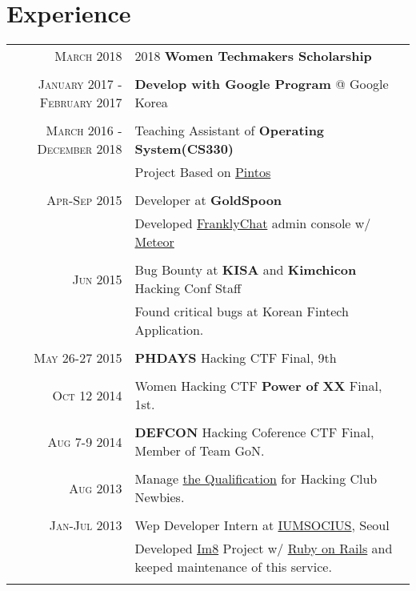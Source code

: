 \documentclass[a4paper,10pt]{article}
\begin{document}
\section{Experience}
\begin{tabular}{r|p{11cm}}
  \textsc{March 2018} & 2018 \textbf{Women Techmakers Scholarship}\\\multicolumn{2}{c}{} \\
    \textsc{January 2017 - February 2017} & \textbf{Develop with Google Program} @ Google Korea\\\multicolumn{2}{c}{} \\
    \textsc{March 2016 - December 2018} & Teaching Assistant of \textbf{Operating System(CS330)}  \\ & \footnotesize{Project Based on \href{https://web.stanford.edu/class/cs140/projects/pintos/pintos.html}{Pintos}}\\\multicolumn{2}{c}{} \\
    \textsc{Apr-Sep 2015} & Developer at \textbf{GoldSpoon}  \\ & \footnotesize{Developed \href{http://www.franklychat.com/}{FranklyChat} admin console w/ \href{https://www.meteor.com/}{Meteor}}\\\multicolumn{2}{c}{} \\
    \textsc{Jun 2015} & Bug Bounty at \textbf{KISA} and \textbf{Kimchicon} Hacking Conf Staff \\&\footnotesize{Found critical bugs at Korean Fintech Application.}\\\multicolumn{2}{c}{} \\
    \textsc{May 26-27 2015} & \textbf{PHDAYS} Hacking CTF Final, 9th \\\multicolumn{2}{c}{} \\
    \textsc{Oct 12 2014} & Women Hacking CTF \textbf{Power of XX} Final, 1st.\\\multicolumn{2}{c}{} \\
    \textsc{Aug 7-9 2014} & \textbf{DEFCON} Hacking Coference CTF Final, Member of Team GoN.\\\multicolumn{2}{c}{} \\
    \textsc{Aug 2013} & Manage \href{http://ubunt32.kaist.ac.kr:3000}{the Qualification} for Hacking Club Newbies.\\\multicolumn{2}{c}{} \\
    \textsc{Jan-Jul 2013} & Wep Developer Intern at \textsc{\href{http://www.iumsocius.com/}{IUMSOCIUS}}, Seoul \\&\footnotesize{Developed \href{http://www.im8.net/}{Im8} Project w/ \href{http://rubyonrails.org/}{Ruby on Rails} and keeped maintenance of this service.}\\\multicolumn{2}{c}{} \\
\end{tabular}
\end{document}
